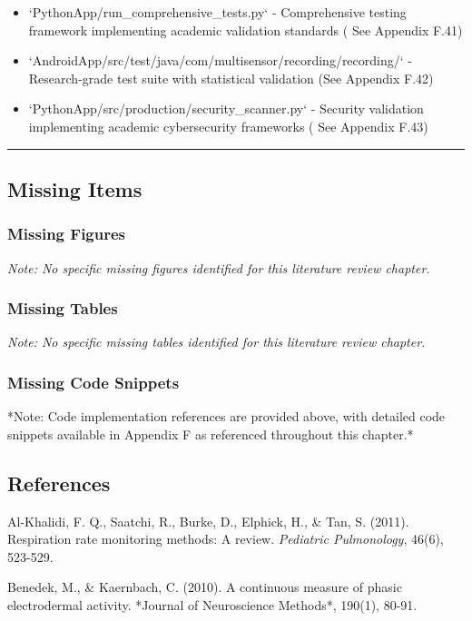 \documentclass[12pt,a4paper]{article}
\begin{document}
\begin{itemize}
\item `PythonApp/run_comprehensive_tests.py` - Comprehensive testing framework implementing academic validation standards (
  See Appendix F.41)
\item `AndroidApp/src/test/java/com/multisensor/recording/recording/` - Research-grade test suite with statistical
  validation (See Appendix F.42)
\item `PythonApp/src/production/security_scanner.py` - Security validation implementing academic cybersecurity frameworks (
  See Appendix F.43)

\end{itemize}
\hrule

\subsection{Missing Items}

\subsubsection{Missing Figures}

\textit{Note: No specific missing figures identified for this literature review chapter.}

\subsubsection{Missing Tables}

\textit{Note: No specific missing tables identified for this literature review chapter.}

\subsubsection{Missing Code Snippets}

*Note: Code implementation references are provided above, with detailed code snippets available in Appendix F as
referenced throughout this chapter.*

\subsection{References}

Al-Khalidi, F. Q., Saatchi, R., Burke, D., Elphick, H., \& Tan, S. (2011). Respiration rate monitoring methods: A review.
\textit{Pediatric Pulmonology}, 46(6), 523-529.

Benedek, M., \& Kaernbach, C. (2010). A continuous measure of phasic electrodermal activity. *Journal of Neuroscience
Methods*, 190(1), 80-91.
\end{document}
